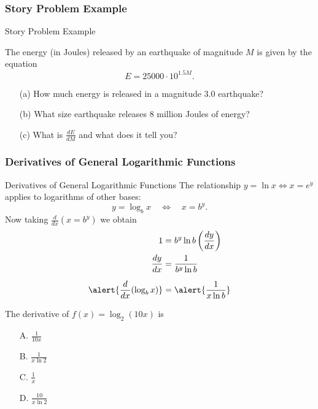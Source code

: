 \documentclass[cal1spr16Lectures.tex]{subfiles}
\begin{document}
\subsubsection{Story Problem Example}

\begin{frame}{\small Story Problem Example}\footnotesize
\begin{ex} The energy (in Joules) released by an earthquake of magnitude $M$ is given by the equation
\[E=25000 \cdot 10^{1.5 M}.\]
\begin{itemize}\footnotesize
\item[(a)] How much energy is released in a magnitude 3.0 earthquake?
\item[(b)] What size earthquake releases 8 million Joules of energy?
\item[(c)] What is $\textstyle\frac{dE}{dM}$ and what does it tell you?
\end{itemize}
\end{ex}
\end{frame}

\subsubsection{Derivatives of General Logarithmic Functions}

\begin{frame}{\small Derivatives of General Logarithmic Functions}\footnotesize
The relationship $y=\ln x \Longleftrightarrow x=e^y$ applies to logarithms of other bases:
\[y=\log_b x \quad\Longleftrightarrow\quad x=b^y.\]
Now taking $\textstyle\frac{d}{dx}\left(x=b^y\right)$ we obtain
\vspace{-0.75pc}
\begin{align*}
1 &= b^y\ln b\left(\frac{dy}{dx}\right) \\
\frac{dy}{dx} &= \frac{1}{b^y \ln b} \\[0.5pc]
\alert{\frac{d}{dx}(\log_b x)} &=\alert{\frac{1}{x \ln b}} 
\end{align*}
\end{frame}

\begin{frame}
\begin{ex}
The derivative of $f(x)=\log_2{(10x)}$ is
\begin{itemize}
\item[A. ] $\textstyle\frac{1}{10x}$
\item[B. ] $\textstyle\frac{1}{x\ln 2}$
\item[C. ] $\textstyle\frac{1}{x}$
\item[D. ] $\textstyle\frac{10}{x\ln 2}$
\end{itemize}
\end{ex}
\end{frame}
\end{document}
